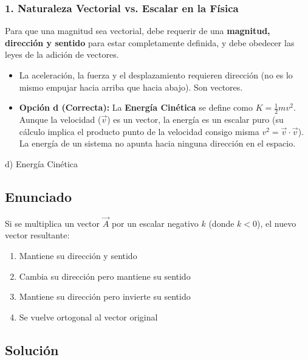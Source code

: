 \documentclass[12pt, a4paper]{article}
\begin{document}
\subsubsection*{1. Naturaleza Vectorial vs. Escalar en la Física}
Para que una magnitud sea vectorial, debe requerir de una \textbf{magnitud, dirección y sentido} para estar completamente definida, y debe obedecer las leyes de la adición de vectores.
\begin{itemize}
    \item La aceleración, la fuerza y el desplazamiento requieren dirección (no es lo mismo empujar hacia arriba que hacia abajo). Son vectores.
    \item \textbf{Opción d (Correcta):} La \textbf{Energía Cinética} se define como $K = \frac{1}{2} m v^2$. Aunque la velocidad ($\vec{v}$) es un vector, la energía es un escalar puro (su cálculo implica el producto punto de la velocidad consigo misma $v^2 = \vec{v} \cdot \vec{v}$). La energía de un sistema no apunta hacia ninguna dirección en el espacio.
\end{itemize}

\begin{tcolorbox}[colback=green!5!white, colframe=green!50!black, title=Respuesta Final]
\centering \Large d) Energía Cinética
\end{tcolorbox}

\newpage


\subsection*{Enunciado}
Si se multiplica un vector $\vec{A}$ por un escalar negativo $k$ (donde $k < 0$), el nuevo vector resultante:
\begin{enumerate}[label=\alph*)]
    \item Mantiene su dirección y sentido
    \item Cambia su dirección pero mantiene su sentido
    \item Mantiene su dirección pero invierte su sentido
    \item Se vuelve ortogonal al vector original
\end{enumerate}

\subsection*{Solución}
\end{document}
